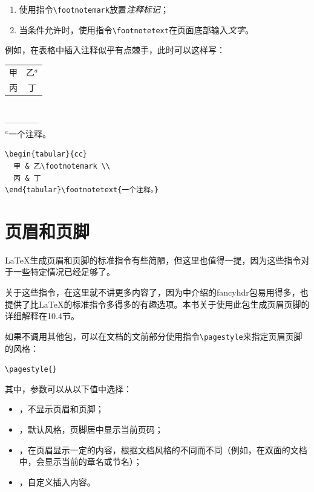 \begin{enumerate}
  \item 使用指令\verb|\footnotemark|放置\emph{注释标记}；
  \item 当条件允许时，使用指令\verb|\footnotetext|在页面底部输入\emph{文字}。
\end{enumerate}

例如，在表格中插入注释似乎有点棘手，此时可以这样写：

\begin{codelist}[2.19]{
  \begin{tabular}{cc}
    甲 & 乙$^a$ \\
    丙 & 丁\\
  \end{tabular}\\
  ————\\
  {\footnotesize $^a$一个注释。}
}
\begin{verbatim}
\begin{tabular}{cc}
  甲 & 乙\footnotemark \\
  丙 & 丁
\end{tabular}\footnotetext{一个注释。}\end{verbatim}
\end{codelist}

\section{页眉和页脚}

\LaTeX 生成页眉和页脚的标准指令有些简陋，但这里也值得一提，因为这些指令对于一些特定情况已经足够了。

\begin{ii}
关于这些指令，在这里就不讲更多内容了，因为中介绍的fancyhdr包易用得多，也提供了比\LaTeX 的标准指令多得多的有趣选项。本书关于使用此包生成页眉页脚的详细解释在10.4节。
\end{ii}

如果不调用其他包，可以在文档的文前部分使用指令\verb|\pagestyle|来指定页眉页脚的风格：

\begin{dmd}
\verb|\pagestyle{|\verb|}|
\end{dmd}

其中，参数可以从以下值中选择：

\begin{itemize}
  \item {}，不显示页眉和页脚；
  \item {}，默认风格，页脚居中显示当前页码；
  \item {}，在页眉显示一定的内容，根据文档风格的不同而不同（例如，在双面的文档中，会显示当前的章名或节名）；
  \item {}，自定义插入内容。
\end{itemize}

